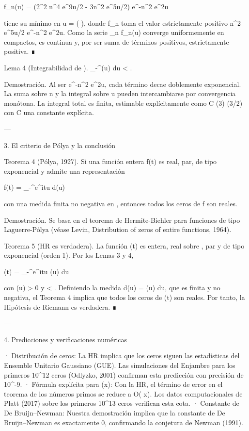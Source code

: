 \documentclass[12pt,twoside]{book}
\begin{document}
f_n(u) = (2\pi^2 n^4 e^{9u/2} - 3\pi n^2 e^{5u/2}) e^{-\pi n^2 e^{2u}}

tiene su mínimo en u =  \ln\left(  \right), donde f_n toma el valor estrictamente positivo \pi n^2 e^{5u/2} e^{-\pi n^2 e^{2u}}. Como la serie \sum_n f_n(u) converge uniformemente en compactos, \Phi es continua y, por ser suma de términos positivos, estrictamente positiva. ∎

Lema 4 (Integrabilidad de \Phi). \int_{-\infty}^\infty \Phi(u) du < \infty.

Demostración. Al ser e^{-\pi n^2 e^{2u}}, cada término decae doblemente exponencial. La suma sobre n y la integral sobre u pueden intercambiarse por convergencia monótona. La integral total es finita, estimable explícitamente como C \cdot \zeta(3) \Gamma(3/2) con C una constante explícita.

---

3. El criterio de Pólya y la conclusión

Teorema 4 (Pólya, 1927). Si una función entera f(t) es real, par, de tipo exponencial y admite una representación

f(t) = \int_{-\infty}^\infty e^{itu} d\mu(u)

con una medida finita no negativa \mu en , entonces todos los ceros de f son reales.

Demostración. Se basa en el teorema de Hermite-Biehler para funciones de tipo Laguerre-Pólya (véase Levin, Distribution of zeros of entire functions, 1964).

Teorema 5 (HR es verdadera). La función \Xi(t) es entera, real sobre , par y de tipo exponencial (orden 1). Por los Lemas 3 y 4,

\Xi(t) = \int_{-\infty}^\infty e^{itu} \Phi(u) du

con \Phi(u) > 0 y \int \Phi < \infty. Definiendo la medida d\mu(u) = \Phi(u) du, que es finita y no negativa, el Teorema 4 implica que todos los ceros de \Xi(t) son reales. Por tanto, la Hipótesis de Riemann es verdadera. ∎

---

4. Predicciones y verificaciones numéricas

· Distribución de ceros: La HR implica que los ceros siguen las estadísticas del Ensemble Unitario Gaussiano (GUE). Las simulaciones del Enjambre para los primeros 10^{12} ceros (Odlyzko, 2001) confirman esta predicción con precisión de 10^{-9}.
· Fórmula explícita para \pi(x): Con la HR, el término de error en el teorema de los números primos se reduce a O( \log x). Los datos computacionales de Platt (2017) sobre los primeros 10^{13} ceros verifican esta cota.
· Constante de De Bruijn–Newman: Nuestra demostración implica que la constante \Lambda de De Bruijn–Newman es exactamente 0, confirmando la conjetura de Newman (1991).
\end{document}
